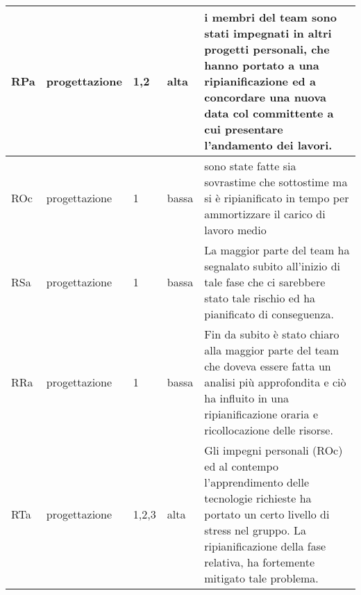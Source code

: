 {\begin{longtable}{|p{0.8cm}|p{2cm}|p{0.8cm}|p{0.8cm}|p{7.6cm}|}
        \hline
        RPa &
        progettazione &
        1,2 & 
        alta &
        i membri del team sono stati impegnati in altri progetti personali, che hanno portato a una ripianificazione ed a concordare una nuova data col committente a cui presentare l'andamento dei lavori.\\
        \hline
        ROc &
        progettazione &
        1 & 
        bassa &
        sono state fatte sia sovrastime che sottostime ma si è ripianificato in tempo per ammortizzare il carico di lavoro medio\\
        \hline
        RSa &
        progettazione &
        1 & 
        bassa &
        La maggior parte del team ha segnalato subito all'inizio di tale fase che ci sarebbere stato tale rischio ed ha pianificato di conseguenza. \\
        \hline
        RRa &
        progettazione &
        1 & 
        bassa & 
         Fin da subito è stato chiaro alla maggior parte del team che doveva essere fatta un analisi più approfondita e ciò ha influito in una ripianificazione oraria e ricollocazione delle risorse.\\
        \hline
        RTa &
        progettazione &
        1,2,3 & 
        alta &
        Gli impegni personali (ROc) ed al contempo l'apprendimento delle tecnologie richieste ha portato un certo livello di stress nel gruppo. La ripianificazione della fase relativa, ha fortemente mitigato tale problema. \\
    \end{longtable}
}